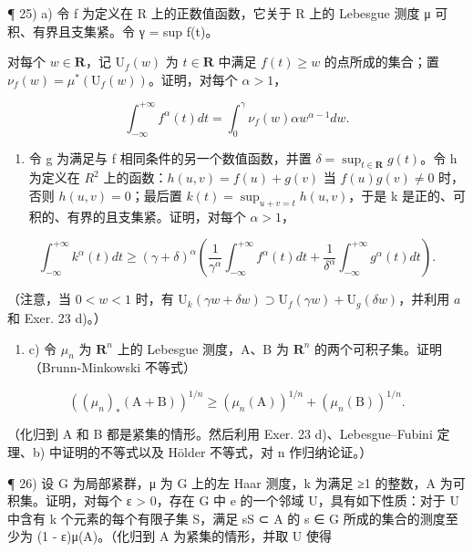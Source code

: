 ¶ 25) a) 令 f 为定义在 R 上的正数值函数，它关于 R 上的 Lebesgue 测度 μ 可积、有界且支集紧。令 γ = sup f(t)。

对每个 \(w \in \mathbf{R}\)，记 \(\mathrm{U}_f(w)\) 为 \(t \in \mathbf{R}\) 中满足 \(f(t) \geqslant w\) 的点所成的集合；置 \(\nu_f(w) = \mu^*(\mathrm{U}_f(w))\)。证明，对每个 \(\alpha > 1\)，

\[
\int_ {- \infty} ^ {+ \infty} f ^ {\alpha} (t) d t = \int_ {0} ^ {\gamma} \nu_ {f} (w) \alpha w ^ {\alpha - 1} d w.
\]

\begin{enumerate}
\def\labelenumi{\alph{enumi})}
\setcounter{enumi}{1}
\tightlist
\item
  令 g 为满足与 f 相同条件的另一个数值函数，并置 \(\delta = \sup_{t \in \mathbf{R}} g(t)\)。令 h 为定义在 \(R^{2}\) 上的函数：\(h(u,v) = f(u) + g(v)\) 当 \(f(u)g(v) \neq 0\) 时，否则 \(h(u,v) = 0\)；最后置 \(k(t) = \sup_{u+v=t} h(u,v)\)，于是 k 是正的、可积的、有界的且支集紧。证明，对每个 \(\alpha > 1\)，
\end{enumerate}

\[
\int_ {- \infty} ^ {+ \infty} k ^ {\alpha} (t) d t \geqslant (\gamma + \delta) ^ {\alpha} \left(\frac {1}{\gamma^ {\alpha}} \int_ {- \infty} ^ {+ \infty} f ^ {\alpha} (t) d t + \frac {1}{\delta^ {\alpha}} \int_ {- \infty} ^ {+ \infty} g ^ {\alpha} (t) d t\right).
\]

（注意，当 \(0 < w < 1\) 时，有 \(\mathrm{U}_k(\gamma w + \delta w) \supset \mathrm{U}_f(\gamma w) + \mathrm{U}_g(\delta w)\)，并利用 \(a\) 和 Exer. 23 d)。）

\begin{enumerate}
\def\labelenumi{\alph{enumi})}
\setcounter{enumi}{2}
\tightlist
\item
  c) 令 \(\mu_{n}\) 为 \(\mathbf{R}^{n}\) 上的 Lebesgue 测度，A、B 为 \(\mathbf{R}^{n}\) 的两个可积子集。证明（Brunn-Minkowski 不等式）
\end{enumerate}

\[
\left(\left(\mu_ {n}\right) _ {*} (\mathrm{A} + \mathrm{B})\right) ^ {1 / n} \geqslant \left(\mu_ {n} (\mathrm{A})\right) ^ {1 / n} + \left(\mu_ {n} (\mathrm{B})\right) ^ {1 / n}.
\]

（化归到 A 和 B 都是紧集的情形。然后利用 Exer. 23 d)、Lebesgue--Fubini 定理、b) 中证明的不等式以及 Hölder 不等式，对 n 作归纳论证。）

¶ 26) 设 G 为局部紧群，μ 为 G 上的左 Haar 测度，k 为满足 ≥1 的整数，A 为可积集。证明，对每个 ε \textgreater{} 0，存在 G 中 e 的一个邻域 U，具有如下性质：对于 U 中含有 k 个元素的每个有限子集 S，满足 sS ⊂ A 的 s ∈ G 所成的集合的测度至少为 (1 - ε)μ(A)。（化归到 A 为紧集的情形，并取 U 使得

